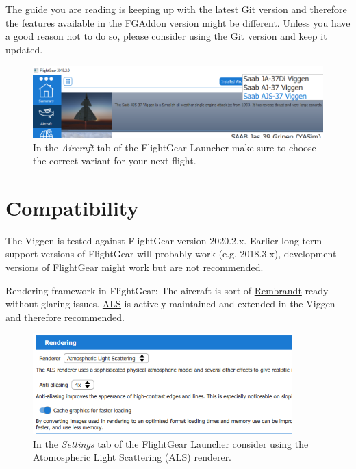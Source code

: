 The guide you are reading is keeping up with the latest Git version and therefore the features available in the FGAddon version might be different. Unless you have a good reason not to do so, please consider using the Git version and keep it updated.

\begin{figure}[h]
\includegraphics[width=15cm]{images/fg_launcher_choose_aircraft_variant.png}
\caption[Choose Viggen variant in Launcher]{In the \emph{Aircraft} tab of the FlightGear Launcher make sure to choose the correct variant for your next flight.}
\end{figure}

\section{Compatibility}
The Viggen is tested against FlightGear version 2020.2.x. Earlier long-term support versions of FlightGear will probably work (e.g. 2018.3.x), development versions of FlightGear might work but are not recommended.

Rendering framework in FlightGear: The aircraft is sort of \href{http://wiki.flightgear.org/Project_Rembrandt}{Rembrandt} ready without glaring issues. \href{http://wiki.flightgear.org/Atmospheric_light_scattering}{ALS} is actively maintained and extended in the Viggen and therefore recommended.

\begin{figure}[h]
\centering
 \includegraphics[width=10cm]{images/launcher_settings_renderer.png}
 \caption[Choose rendering settings in Launcher]{In the \emph{Settings} tab of the FlightGear Launcher consider using the Atomospheric Light Scattering (ALS) renderer.}
\end{figure}

